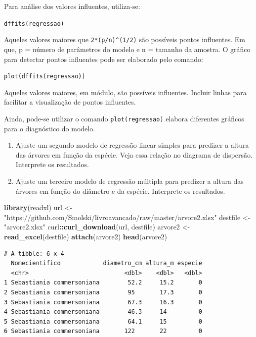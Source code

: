 \documentclass[12pt,brazil,oneside]{book}
\newenvironment{Shaded}{\begin{snugshade}}{\end{snugshade}}
\newcommand{\KeywordTok}[1]{\textcolor[rgb]{0.13,0.29,0.53}{\textbf{#1}}}
\newcommand{\NormalTok}[1]{#1}
\newcommand{\OperatorTok}[1]{\textcolor[rgb]{0.81,0.36,0.00}{\textbf{#1}}}
\newcommand{\StringTok}[1]{\textcolor[rgb]{0.31,0.60,0.02}{#1}}
\begin{document}
Para análise dos valores influentes, utiliza-se:

\texttt{dffits(regressao)}

Aqueles valores maiores que \texttt{2*(p/n)\^{}(1/2)} são possíveis pontos influentes. Em que, p = número de parâmetros do modelo e n = tamanho da amostra. O gráfico para detectar pontos influentes pode ser elaborado pelo comando:

\texttt{plot(dffits(regressao))}

Aqueles valores maiores, em módulo, são possíveis influentes. Incluir linhas para facilitar a visualização de pontos influentes.

Ainda, pode-se utilizar o comando \texttt{plot(regressao)} elabora diferentes gráficos para o diagnóstico do modelo.

\begin{enumerate}
\def\labelenumi{\arabic{enumi})}
\setcounter{enumi}{1}
\item
  Ajuste um segundo modelo de regressão linear simples para predizer a altura das árvores em função da espécie. Veja essa relação no diagrama de dispersão. Interprete os resultados.
\item
  Ajuste um terceiro modelo de regressão múltipla para predizer a altura das árvores em função do diâmetro e da espécie. Interprete os resultados.
\end{enumerate}

\begin{Shaded}
\begin{Highlighting}[]
\KeywordTok{library}\NormalTok{(readxl)}
\NormalTok{url <-}\StringTok{ "https://github.com/Smolski/livroavancado/raw/master/arvore2.xlsx"}
\NormalTok{destfile <-}\StringTok{ "arvore2.xlsx"}
\NormalTok{curl}\OperatorTok{::}\KeywordTok{curl_download}\NormalTok{(url, destfile)}
\NormalTok{arvore2 <-}\StringTok{ }\KeywordTok{read_excel}\NormalTok{(destfile)}
\KeywordTok{attach}\NormalTok{(arvore2)}
\KeywordTok{head}\NormalTok{(arvore2)}
\end{Highlighting}
\end{Shaded}

\begin{verbatim}
# A tibble: 6 x 4
  Nomecientifico            diametro_cm altura_m especie
  <chr>                           <dbl>    <dbl>   <dbl>
1 Sebastiania commersoniana        52.2     15.2       0
2 Sebastiania commersoniana        95       17.3       0
3 Sebastiania commersoniana        67.3     16.3       0
4 Sebastiania commersoniana        46.3     14         0
5 Sebastiania commersoniana        64.1     15         0
6 Sebastiania commersoniana       122       22         0
\end{verbatim}
\end{document}
